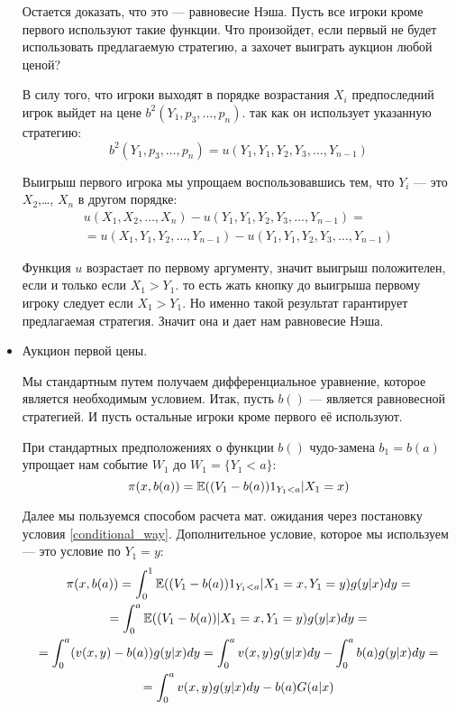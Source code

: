 \begin{itemize}
Остается доказать, что это — равновесие Нэша. Пусть все игроки кроме первого используют такие функции. Что произойдет, если первый не будет использовать предлагаемую стратегию, а захочет выиграть аукцион любой ценой?

В силу того, что игроки выходят в порядке возрастания $ X_{i} $ предпоследний игрок выйдет на цене $ b^{2}(Y_{1},p_{3},\ldots,p_{n}) $. так как он использует указанную стратегию:
\begin{equation}
b^{2}(Y_{1},p_{3},\ldots,p_{n}) =u(Y_{1},Y_{1},Y_{2},Y_{3},\ldots,Y_{n-1})
\end{equation}

Выигрыш первого игрока мы упрощаем воспользовавшись тем, что $ Y_{i} $ — это $ X_{2} $,\ldots, $ X_{n} $ в другом порядке:
\begin{multline}
u(X_{1},X_{2},\ldots,X_{n})-u(Y_{1},Y_{1},Y_{2},Y_{3},\ldots,Y_{n-1})=\\
=u(X_{1},Y_{1},Y_{2},\ldots,Y_{n-1})-u(Y_{1},Y_{1},Y_{2},Y_{3},\ldots,Y_{n-1})
\end{multline}

Функция $ u $ возрастает по первому аргументу, значит выигрыш положителен, если и только если $ X_{1}>Y_{1} $. то есть жать кнопку до выигрыша первому игроку следует если $ X_{1}>Y_{1} $. Но именно такой результат гарантирует предлагаемая стратегия. Значит она и дает нам равновесие Нэша.


\item Аукцион первой цены.

Мы стандартным путем получаем дифференциальное уравнение, которое является необходимым условием. Итак, пусть $ b() $ — является равновесной стратегией. И пусть остальные игроки кроме первого её используют.

При стандартных предположениях о функции $ b() $ чудо-замена $ b_{1}=b(a) $ упрощает нам событие $ W_{1} $ до $ W_{1}=\{Y_{1}<a\} $:
\begin{equation}
\pi(x,b(a))=\mathbb{E}((V_{1}-b(a))1_{Y_{1}<a}|X_{1}=x)
\end{equation}

Далее мы пользуемся способом расчета мат. ожидания через постановку условия \ref{conditional_way}. Дополнительное условие, которое мы используем — это условие по $ Y_{1}=y $:
\begin{multline}
\pi(x,b(a))=\int_{0}^{1}\mathbb{E}((V_{1}-b(a))1_{Y_{1}<a}|X_{1}=x,Y_{1}=y)g(y|x)dy=\\
=\int_{0}^{a}\mathbb{E}((V_{1}-b(a))|X_{1}=x,Y_{1}=y)g(y|x)dy=\\
=\int_{0}^{a}(v(x,y)-b(a))g(y|x)dy=\int_{0}^{a}v(x,y)g(y|x)dy-\int_{0}^{a}b(a)g(y|x)dy=\\
=\int_{0}^{a}v(x,y)g(y|x)dy-b(a)G(a|x)
\end{multline}


\end{itemize}

